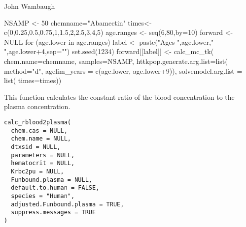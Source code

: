 \documentclass[a4paper]{book}
\begin{document}
%
\begin{Author}\relax
John Wambaugh
\end{Author}
%
\begin{Examples}
\begin{ExampleCode}


NSAMP <- 50
chemname="Abamectin"
times<- c(0,0.25,0.5,0.75,1,1.5,2,2.5,3,4,5)
age.ranges <- seq(6,80,by=10)
forward <- NULL
for (age.lower in age.ranges)
{
  label <- paste("Ages ",age.lower,"-",age.lower+4,sep="")
  set.seed(1234)
  forward[[label]] <- calc_mc_tk(
                        chem.name=chemname,
                        samples=NSAMP,
                        httkpop.generate.arg.list=list(
                          method="d",
                          agelim_years = c(age.lower, age.lower+9)),
                        solvemodel.arg.list = list(
                          times=times))
}


\end{ExampleCode}
\end{Examples}
%
\begin{Description}\relax
This function calculates the constant ratio of the blood concentration to
the plasma concentration.
\end{Description}
%
\begin{Usage}
\begin{verbatim}
calc_rblood2plasma(
  chem.cas = NULL,
  chem.name = NULL,
  dtxsid = NULL,
  parameters = NULL,
  hematocrit = NULL,
  Krbc2pu = NULL,
  Funbound.plasma = NULL,
  default.to.human = FALSE,
  species = "Human",
  adjusted.Funbound.plasma = TRUE,
  suppress.messages = TRUE
)
\end{verbatim}
\end{Usage}
%
\end{document}
